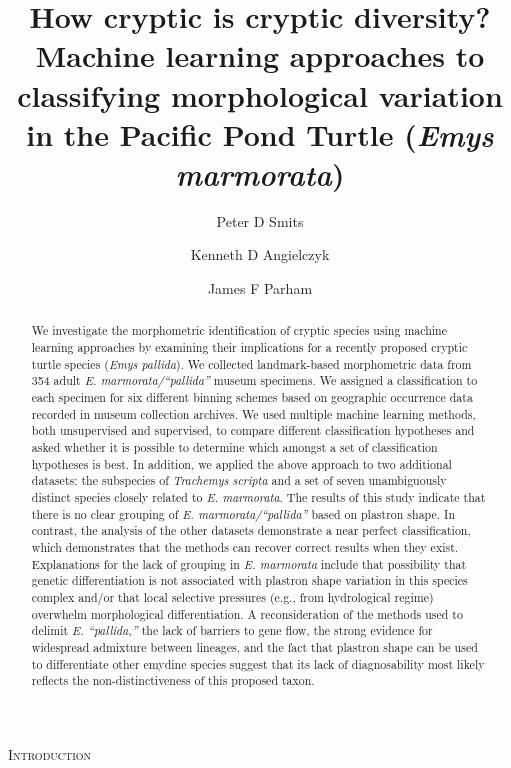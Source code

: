 \documentclass[12pt,letterpaper]{article}
\title{How cryptic is cryptic diversity? Machine learning approaches to classifying morphological variation in the Pacific Pond Turtle (\textit{Emys marmorata})}
\author[1]{Peter D Smits}%
\author[1,2]{Kenneth D Angielczyk}%
\author[3]{James F Parham}%
\affil[1]{Committee on Evolutionary Biology, University of Chicago}
\affil[2]{Integrative Research Center, Field Museum of Natural History}
\affil[3]{Department of Geological Sciences, California State University -- Fullerton}
\renewcommand{\section}[1]{%
\bigskip
\begin{center}
\begin{Large}
\normalfont\scshape #1
\medskip
\end{Large}
\end{center}}
\begin{document}
\maketitle
{}

\linenumbers
\modulolinenumbers[2]

\begin{abstract}
  We investigate the morphometric identification of cryptic species using machine learning approaches by examining their implications for a recently proposed cryptic turtle species (\textit{Emys pallida}). We collected landmark-based morphometric data from 354 adult \textit{E. marmorata/``pallida''} museum specimens. We assigned a classification to each specimen for six different binning schemes based on geographic occurrence data recorded in museum collection archives. We used multiple machine learning methods, both unsupervised and supervised, to compare different classification hypotheses and asked whether it is possible to determine which amongst a set of classification hypotheses is best. 
  In addition, we applied the above approach to two additional datasets: the subspecies of \textit{Trachemys scripta} and a set of seven unambiguously distinct species closely related to \textit{E. marmorata}. The results of this study indicate that there is no clear grouping of \textit{E. marmorata/``pallida''} based on plastron shape. In contrast, the analysis of the other datasets demonstrate a near perfect classification, which demonstrates that the methods can recover correct results when they exist. Explanations for the lack of grouping in \textit{E. marmorata} include that possibility that genetic differentiation is not associated with plastron shape variation in this species complex and/or that local selective pressures (e.g., from hydrological regime) overwhelm morphological differentiation. A reconsideration of the methods used to delimit \textit{E. ``pallida,''} the lack of barriers to gene flow, the strong evidence for widespread admixture between lineages, and the fact that plastron shape can be used to differentiate other emydine species suggest that its lack of diagnosability most likely reflects the non-distinctiveness of this proposed taxon.
\end{abstract}

\section{Introduction}
\end{document}
